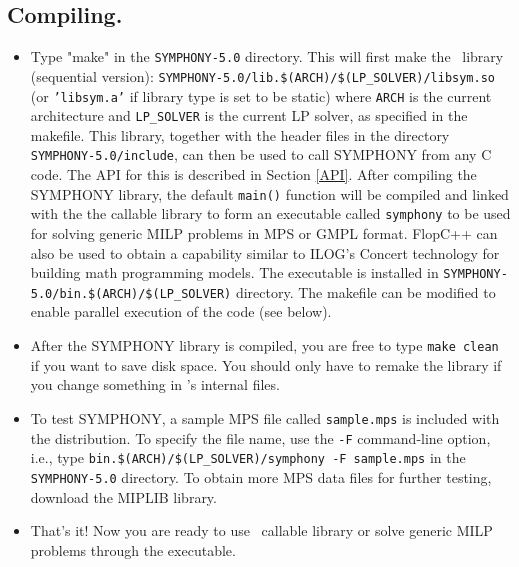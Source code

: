 \begin{itemize}
\end{itemize}
        
\subsection{Compiling.}

\begin{itemize}

      \item Type "make" in the \texttt{SYMPHONY-5.0} directory. This will 
first make the \BB\ library (sequential version): 
\texttt{SYMPHONY-5.0/lib.\$(ARCH)/\$(LP\_SOLVER)/libsym.so} (or 
\texttt{'libsym.a'} if library type is set to be static) where 
\texttt{ARCH} is the current architecture and \texttt{LP\_SOLVER} is the 
current LP solver, as specified in the makefile. This library, together with
the header files in the directory \texttt{SYMPHONY-5.0/include}, can then be
used to call SYMPHONY from any C code. The API for this is described in
Section \ref{API}. After compiling the SYMPHONY library, the default
\texttt{main()} function will be compiled and linked with the the callable
library to form an executable called \texttt{symphony} to be used for solving
generic MILP problems in MPS or GMPL format. FlopC++ can also be used to
obtain a capability similar to ILOG's Concert technology for building math
programming models. The executable is installed in
\texttt{SYMPHONY-5.0/bin.\$(ARCH)/\$(LP\_SOLVER)} directory. The makefile 
can be modified to enable parallel execution of the code (see below).

\item After the SYMPHONY library is compiled, you are free to type {\tt make
        clean} if you want to save disk space. You should only have to
        remake the library if you change something in \BB's internal files. 

\item To test SYMPHONY, a sample MPS file called \texttt{sample.mps} is 
included with the distribution. To specify the file name, use the 
\texttt{-F} command-line option, i.e., 
type \texttt{bin.\$(ARCH)/\$(LP\_SOLVER)/symphony -F sample.mps} in the
\texttt{SYMPHONY-5.0} directory. To obtain more MPS data files for further
testing, download the MIPLIB library.

\item That's it! Now you are ready to use \BB\ callable library or 
solve generic MILP problems through the executable.

\end{itemize}


